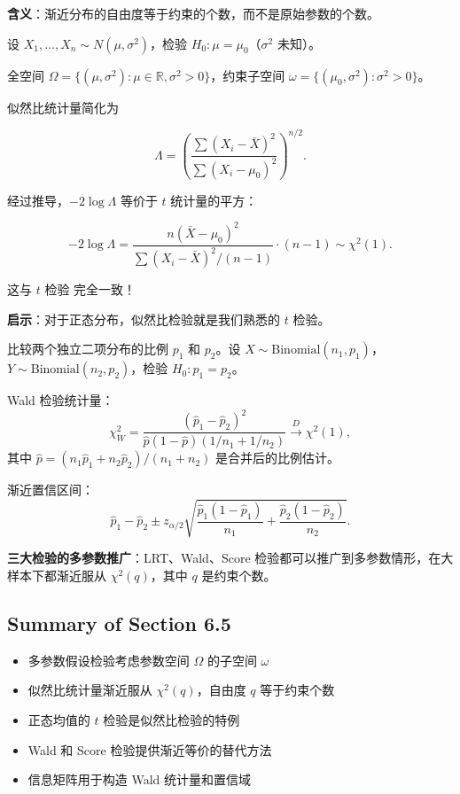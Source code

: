 \textbf{含义}：渐近分布的自由度等于约束的个数，而不是原始参数的个数。

\begin{example}[正态均值的检验]\label{ex:normal-mean-test-multiparameter}
设 $X_1, \ldots, X_n \sim N(\mu, \sigma^2)$，检验 $H_0: \mu = \mu_0$（$\sigma^2$ 未知）。

全空间 $\Omega = \{(\mu, \sigma^2): \mu \in \mathbb{R}, \sigma^2 > 0\}$，约束子空间 $\omega = \{(\mu_0, \sigma^2): \sigma^2 > 0\}$。

似然比统计量简化为

\[
\Lambda = \left( \frac{\sum(X_i - \bar{X})^2}{\sum(X_i - \mu_0)^2} \right)^{n/2}.
\]

经过推导，$-2\log\Lambda$ 等价于 $t$ 统计量的平方：

\[
-2\log\Lambda = \frac{n(\bar{X} - \mu_0)^2}{\sum(X_i - \bar{X})^2/(n-1)} \cdot (n-1) \sim \chi^2(1).
\]

这与 $t$ 检验 完全一致！

\textbf{启示}：对于正态分布，似然比检验就是我们熟悉的 $t$ 检验。
\end{example}

\begin{example}[二项比例的检验]\label{ex:binomial-proportion-test}
比较两个独立二项分布的比例 $p_1$ 和 $p_2$。设 $X \sim \text{Binomial}(n_1, p_1)$，$Y \sim \text{Binomial}(n_2, p_2)$，检验 $H_0: p_1 = p_2$。

Wald 检验统计量：
\[
\chi_W^2 = \frac{(\widehat{p}_1 - \widehat{p}_2)^2}{\widehat{p}(1-\widehat{p})(1/n_1 + 1/n_2)} \xrightarrow{D} \chi^2(1),
\]
其中 $\widehat{p} = (n_1\widehat{p}_1 + n_2\widehat{p}_2)/(n_1 + n_2)$ 是合并后的比例估计。

渐近置信区间：
\[
\widehat{p}_1 - \widehat{p}_2 \pm z_{\alpha/2}\sqrt{\frac{\widehat{p}_1(1-\widehat{p}_1)}{n_1} + \frac{\widehat{p}_2(1-\widehat{p}_2)}{n_2}}.
\]
\end{example}

\begin{remark}
\textbf{三大检验的多参数推广}：LRT、Wald、Score 检验都可以推广到多参数情形，在大样本下都渐近服从 $\chi^2(q)$，其中 $q$ 是约束个数。
\end{remark}

\subsection{Summary of Section 6.5}

\begin{itemize}
\item 多参数假设检验考虑参数空间 $\Omega$ 的子空间 $\omega$
\item 似然比统计量渐近服从 $\chi^2(q)$，自由度 $q$ 等于约束个数
\item 正态均值的 $t$ 检验是似然比检验的特例
\item Wald 和 Score 检验提供渐近等价的替代方法
\item 信息矩阵用于构造 Wald 统计量和置信域
\end{itemize}

